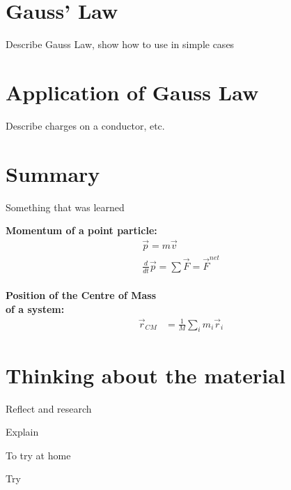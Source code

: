 \section{Gauss' Law}
Describe Gauss Law, show how to use in simple cases



\section{Application of Gauss Law}
Describe charges on a conductor, etc.



\newpage
\section{Summary}

\begin{chapterSummary}
 Something that was learned
\end{chapterSummary}

\newpage
\begin{importantEquations}
\medskip
\begin{multicols}{2}
\textbf{Momentum of a point particle:}
\begin{align*}
\vec p = m\vec v \\
\frac{d}{dt}\vec p = \sum \vec F = \vec F^{net}
\end{align*}
\columnbreak
\\
\textbf{Position of the Centre of Mass \\ of a system:}
\begin{align*}
\vec r_{CM} &=\frac{1}{M}\sum_i m_i\vec r_i 
\end{align*}
\medskip
\end{multicols}
\end{importantEquations}

\newpage
\section{Thinking about the material}

\begin{chapteractivity}{Reflect and research}
{
\item Explain
}
\end{chapteractivity}

\begin{chapteractivity}{To try at home}
{
\item Try
}
\end{chapteractivity}

